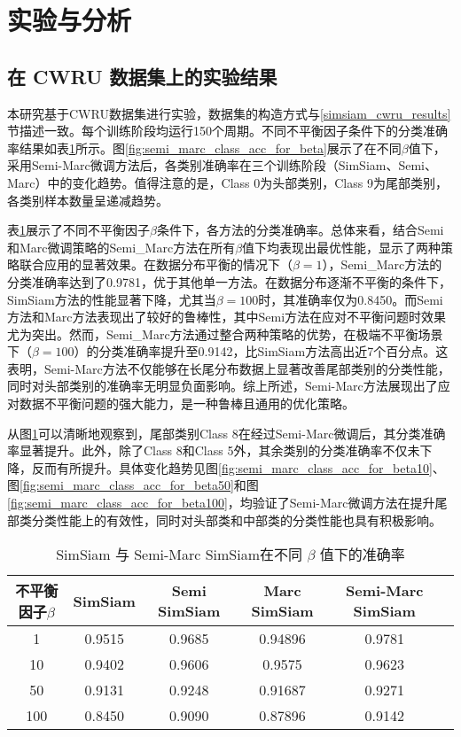 \documentclass[master]{thesis-uestc}
\begin{document}
\section{实验与分析}

\subsection{在 CWRU 数据集上的实验结果}
本研究基于CWRU数据集进行实验，数据集的构造方式与\ref{simsiam_cwru_results}节描述一致。每个训练阶段均运行150个周期。不同不平衡因子条件下的分类准确率结果如表\ref{simsiam_semi_results}所示。图\ref{fig:semi_marc_class_acc_for_beta}展示了在不同$\beta$值下，采用Semi-Marc微调方法后，各类别准确率在三个训练阶段（SimSiam、Semi、Marc）中的变化趋势。值得注意的是，Class 0为头部类别，Class 9为尾部类别，各类别样本数量呈递减趋势。

表\ref{simsiam_semi_results}展示了不同不平衡因子$\beta$条件下，各方法的分类准确率。总体来看，结合Semi和Marc微调策略的Semi\_Marc方法在所有$\beta$值下均表现出最优性能，显示了两种策略联合应用的显著效果。在数据分布平衡的情况下（$\beta=1$），Semi\_Marc方法的分类准确率达到了0.9781，优于其他单一方法。在数据分布逐渐不平衡的条件下，SimSiam方法的性能显著下降，尤其当$\beta=100$时，其准确率仅为0.8450。而Semi方法和Marc方法表现出了较好的鲁棒性，其中Semi方法在应对不平衡问题时效果尤为突出。然而，Semi\_Marc方法通过整合两种策略的优势，在极端不平衡场景下（$\beta=100$）的分类准确率提升至0.9142，比SimSiam方法高出近7个百分点。这表明，Semi-Marc方法不仅能够在长尾分布数据上显著改善尾部类别的分类性能，同时对头部类别的准确率无明显负面影响。综上所述，Semi-Marc方法展现出了应对数据不平衡问题的强大能力，是一种鲁棒且通用的优化策略。

从图\ref{simsiam_semi_results}可以清晰地观察到，尾部类别Class 8在经过Semi-Marc微调后，其分类准确率显著提升。此外，除了Class 8和Class 5外，其余类别的分类准确率不仅未下降，反而有所提升。具体变化趋势见图\ref{fig:semi_marc_class_acc_for_beta10}、图\ref{fig:semi_marc_class_acc_for_beta50}和图\ref{fig:semi_marc_class_acc_for_beta100}，均验证了Semi-Marc微调方法在提升尾部类分类性能上的有效性，同时对头部类和中部类的分类性能也具有积极影响。

\begin{table}[h]
    \caption{SimSiam 与 Semi-Marc SimSiam在不同 $\beta$ 值下的准确率}
    \centering
    \begin{tabular}{cccccc}
    \toprule
    不平衡因子$\beta$  & SimSiam & Semi SimSiam & Marc SimSiam& Semi-Marc SimSiam\\
    \midrule
    1   & 0.9515  & 0.9685 & 0.94896 & 0.9781 \\
    10  & 0.9402  & 0.9606 & 0.9575  & 0.9623 \\
    50  & 0.9131  & 0.9248 & 0.91687 & 0.9271 \\
    100 & 0.8450  & 0.9090 & 0.87896 & 0.9142 \\
    \bottomrule
    \end{tabular}
    \label{simsiam_semi_results}
\end{table}
\end{document}
